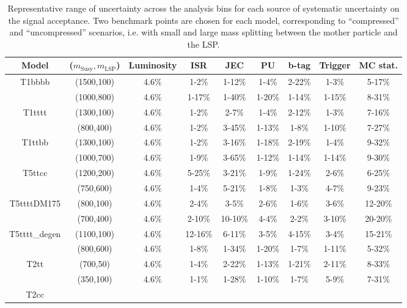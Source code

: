 \clearpage
\begin{table}[h!]
  \caption{Representative range of uncertainty across the analysis bins 
    for each source of systematic uncertainty on the signal acceptance.
    Two benchmark points are chosen for each model, 
    corresponding to ``compressed'' and ``uncompressed'' scenarios, 
    i.e. with small and large mass splitting between the mother particle and the LSP.
    \label{tab:sig-systematics}   
  }
  \centering
  \begin{tabular}{ ccccccccc }
    \hline
    \hline
Model & ($m_{\mathrm{Susy}},m_{\mathrm{LSP}}$) & Luminosity & ISR & JEC & PU & b-tag & Trigger & MC stat. \\ \hline
\multirow{2}{*}{T1bbbb}
 & (1500,100) & 4.6\% & 1-2\% & 1-12\% & 1-4\% & 2-22\% & 1-3\% & 5-17\% \\ 
 & (1000,800) & 4.6\% & 1-17\% & 1-40\% & 1-20\% & 1-14\% & 1-15\% & 8-31\% \\ \hline 
\multirow{2}{*}{T1tttt}
 & (1300,100) & 4.6\% & 1-2\% & 2-7\% & 1-4\% & 2-12\% & 1-3\% & 7-16\% \\ 
 & (800,400) & 4.6\% & 1-2\% & 3-45\% & 1-13\% & 1-8\% & 1-10\% & 7-27\% \\ \hline 
\multirow{2}{*}{T1ttbb}
 & (1300,100) & 4.6\% & 1-2\% & 3-16\% & 1-18\% & 2-19\% & 1-4\% & 9-32\% \\ 
 & (1000,700) & 4.6\% & 1-9\% & 3-65\% & 1-12\% & 1-14\% & 1-14\% & 9-30\% \\ \hline 
\multirow{2}{*}{T5ttcc}
 & (1200,200) & 4.6\% & 5-25\% & 3-21\% & 1-9\% & 1-24\% & 2-6\% & 6-25\% \\ 
 & (750,600) & 4.6\% & 1-4\% & 5-21\% & 1-8\% & 1-3\% & 4-7\% & 9-23\% \\ \hline 
\multirow{2}{*}{T5ttttDM175}
 & (800,100) & 4.6\% & 2-4\% & 3-5\% & 2-6\% & 1-6\% & 3-6\% & 12-20\% \\ 
 & (700,400) & 4.6\% & 2-10\% & 10-10\% & 4-4\% & 2-2\% & 3-10\% & 20-20\% \\ \hline 
\multirow{2}{*}{T5tttt\_degen}
 & (1100,100) & 4.6\% & 12-16\% & 6-11\% & 3-5\% & 4-15\% & 3-4\% & 15-21\% \\ 
 & (800,600) & 4.6\% & 1-8\% & 1-34\% & 1-20\% & 1-7\% & 1-11\% & 5-32\% \\ \hline 
\multirow{2}{*}{T2tt}
 & (700,50) & 4.6\% & 1-4\% & 2-22\% & 1-13\% & 1-21\% & 2-11\% & 8-33\% \\ 
 & (350,100) & 4.6\% & 1-1\% & 1-28\% & 1-10\% & 1-7\% & 5-9\% & 7-31\% \\ \hline 
\multirow{1}{*}{T2cc}

\end{tabular}
\end{table}
